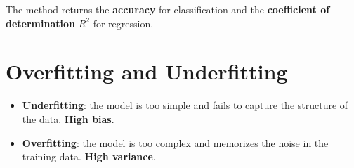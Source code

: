 \begin{remark}
The  method returns the \textbf{accuracy} for classification and the \textbf{coefficient of determination} $R^2$ for regression.
\end{remark}

\section{Overfitting and Underfitting}
\label{sec:overfitting}


\begin{definition}
\begin{itemize}
    \item \textbf{Underfitting}: the model is too simple and fails to capture the structure of the data. \textbf{High bias}.
    \item \textbf{Overfitting}: the model is too complex and memorizes the noise in the training data. \textbf{High variance}.
\end{itemize}
\end{definition}

